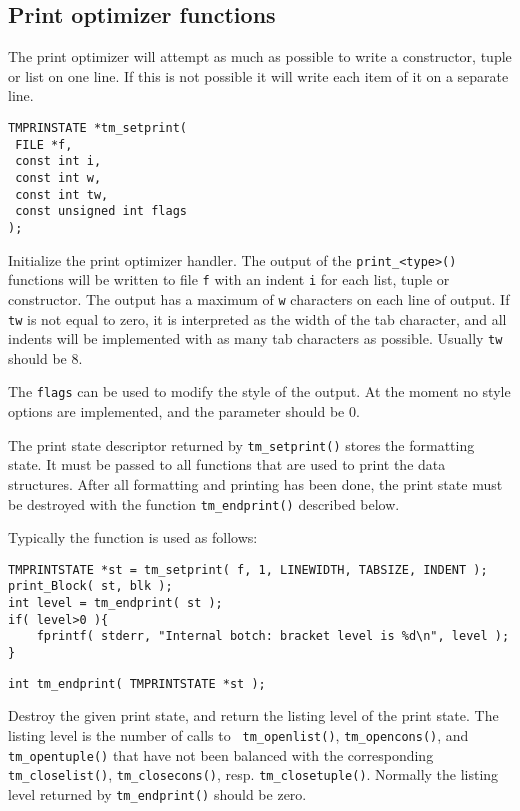 \subsection{Print optimizer functions}
The print optimizer will attempt as much as possible to write a constructor,
tuple or list on one line.
If this is not possible it will write each item of it on a separate line.
\par
\begin{verbatim}
TMPRINSTATE *tm_setprint(
 FILE *f,
 const int i,
 const int w,
 const int tw,
 const unsigned int flags
);
\end{verbatim}
\begin{desc}
Initialize the print optimizer handler.
The output of the \texttt{print\_<type>()} functions will be written to
file \texttt{f} with an indent \texttt{i} for each list, tuple or constructor.
The output has a maximum of \texttt{w} characters on each line of output.
If \texttt{tw} is not equal to zero, it is interpreted as the width of the
tab character, and all indents will be implemented with as many tab
characters as possible.
Usually \verb'tw' should be 8.
\par
The \texttt{flags} can be used to modify the style of the output. At the
moment no style options are implemented, and the parameter should be 0.
\par
The print state descriptor returned by \texttt{tm\_setprint()} stores the
formatting state. It must be passed to all functions that are used to
print the data structures. After all formatting and printing has been
done, the print state must be destroyed with the function \texttt{tm\_endprint()}
described below.
\par
Typically the function is used as follows:
\begin{verbatim}
TMPRINTSTATE *st = tm_setprint( f, 1, LINEWIDTH, TABSIZE, INDENT );
print_Block( st, blk );
int level = tm_endprint( st );
if( level>0 ){
    fprintf( stderr, "Internal botch: bracket level is %d\n", level );
}
\end{verbatim}
\end{desc}
\begin{verbatim}
int tm_endprint( TMPRINTSTATE *st );
\end{verbatim}
\begin{desc}
Destroy the given print state, and return the listing level of
the print state. The listing level is the number of calls to {\tt
tm\_openlist()}, \texttt{tm\_opencons()}, and \texttt{tm\_opentuple()} that
have not been balanced with the corresponding \texttt{tm\_closelist()},
\texttt{tm\_closecons()}, resp.  \texttt{tm\_closetuple()}. Normally the
listing level returned by \texttt{tm\_endprint()} should be zero.
\end{desc}
